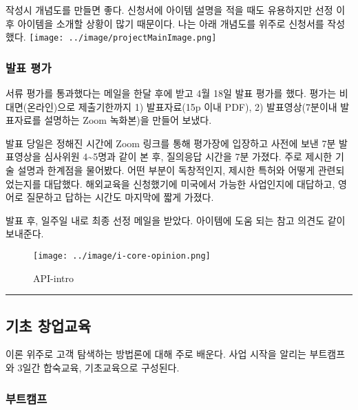 \documentclass[
  letterpaper,
  DIV=11,
  numbers=noendperiod]{scrartcl}
\begin{document}
작성시 개념도를 만들면 좋다. 신청서에 아이템 설명을 적을 때도 유용하지만
선정 이후 아이템을 소개할 상황이 많기 때문이다. 나는 아래 개념도를
위주로 신청서를 작성했다.
\texttt{[image: ../image/projectMainImage.png]}

\hypertarget{uxbc1cuxd45c-uxd3c9uxac00}{%
\subsubsection{발표 평가}\label{uxbc1cuxd45c-uxd3c9uxac00}}

서류 평가를 통과했다는 메일을 한달 후에 받고 4월 18일 발표 평가를 했다.
평가는 비대면(온라인)으로 제출기한까지 1) 발표자료(15p 이내 PDF), 2)
발표영상(7분이내 발표자료를 설명하는 Zoom 녹화본)을 만들어 보냈다.

발표 당일은 정해진 시간에 Zoom 링크를 통해 평가장에 입장하고 사전에 보낸
7분 발표영상을 심사위원 4\textasciitilde5명과 같이 본 후, 질의응답
시간을 7분 가졌다. 주로 제시한 기술 설명과 한계점을 물어봤다. 어떤
부분이 독창적인지, 제시한 특허와 어떻게 관련되었는지를 대답했다.
해외교육을 신청했기에 미국에서 가능한 사업인지에 대답하고, 영어로
질문하고 답하는 시간도 마지막에 짧게 가졌다.

발표 후, 일주일 내로 최종 선정 메일을 받았다. 아이템에 도움 되는 참고
의견도 같이 보내준다.

\begin{figure}

{\centering \texttt{[image: ../image/i-core-opinion.png]}

}

\caption{API-intro}

\end{figure}

\begin{center}\rule{0.5\linewidth}{0.5pt}\end{center}

\hypertarget{uxae30uxcd08-uxcc3duxc5c5uxad50uxc721}{%
\subsection{기초 창업교육}\label{uxae30uxcd08-uxcc3duxc5c5uxad50uxc721}}

이론 위주로 고객 탐색하는 방법론에 대해 주로 배운다. 사업 시작을 알리는
부트캠프와 3일간 합숙교육, 기초교육으로 구성된다.

\hypertarget{uxbd80uxd2b8uxcea0uxd504}{%
\subsubsection{부트캠프}\label{uxbd80uxd2b8uxcea0uxd504}}
\end{document}
